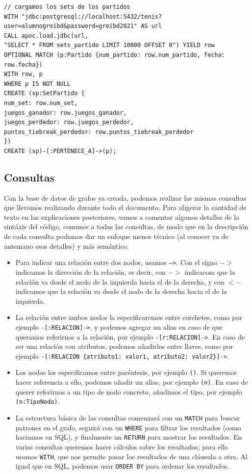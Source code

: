 \begin{verbatim}
// cargamos los sets de los partidos
WITH "jdbc:postgresql://localhost:5432/tenis?user=alumnogreibd&password=greibd2021" AS url
CALL apoc.load.jdbc(url,
"SELECT * FROM sets_partido LIMIT 10000 OFFSET 0") YIELD row
OPTIONAL MATCH (p:Partido {num_partido: row.num_partido, fecha: row.fecha})
WITH row, p
WHERE p IS NOT NULL
CREATE (sp:SetPartido {
num_set: row.num_set,
juegos_ganador: row.juegos_ganador,
juegos_perdedor: row.juegos_perdedor,
puntos_tiebreak_perdedor: row.puntos_tiebreak_perdedor
})
CREATE (sp)-[:PERTENECE_A]->(p);
\end{verbatim}


\subsection{Consultas}

Con la base de datos de grafos ya creada, podemos realizar las mismas consultas que llevamos realizando durante todo el documento. Para aligerar la cantidad de texto en las explicaciones posteriores, vamos a comentar algunos detalles de la sintáxis del código, comunes a todas las consultas, de modo que en la descripción de cada consulta podamos dar un enfoque menos técnico (al conocer ya de antemano esos detalles) y más semántico. 
\begin{itemize}
\item Para indicar una relación entre dos nodos, usamos \texttt{-->}. Con el signo $->$ indicamos la dirección de la relación, es decir, con $->$ indicacom que la relación va desde el nodo de la izquierda hacia el de la derecha, y con $<-$ indicamos que la relación va desde el nodo de la derecha hacia el de la izquierda.
\item La relación entre ambos nodos la especificaremos entre corchetes, como por ejemplo \texttt{-[:RELACION]->}, y podemos agregar un alias en caso de que queramos referirnos a la relación, por ejemplo \texttt{-[r:RELACION]->}. En caso de ser una relación con atributos, podemos añadirlos entre llaves, como por ejemplo \texttt{-[:RELACION \{atributo1: valor1, atributo2: valor2\}]->}.
\item Los nodos los especificamos entre paréntesis, por ejemplo \texttt{()}. Si queremos hacer referencia a ello, podemos añadir un alias, por ejemplo \texttt{(n)}. En caso de querer referirnos a un tipo de nodo concreto, añadimos el tipo, por ejemplo \texttt{(n:TipoNodo)}.
\item La estructura básica de las consultas comenzará con un \texttt{MATCH} para buscar patrones en el grafo, seguirá con un \texttt{WHERE} para filtrar los resultados (como haciamos en SQL), y finalmente un \texttt{RETURN} para mostrar los resultados. En varias consultas queremos hacer cálculos sobre los resultados; para ello usamos \texttt{WITH}, que nos permite pasar los resultados de una cláusula a otra. Al igual que en SQL, podemos usar \texttt{ORDER BY} para ordenar los resultados.
\end{itemize}

